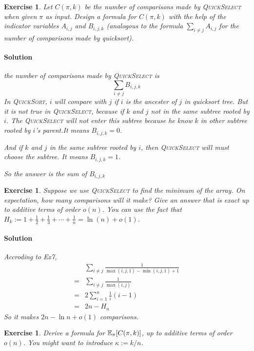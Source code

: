 \documentclass[12pt,a4]{article}
\newcommand{\E}{\mathop{\mathbb{E\/}}}
\newtheorem{exercise}[theorem]{Exercise}
\begin{document}
\begin{exercise}
  Let $C(\pi,k)$ be the number of comparisons made by \textsc{QuickSelect} when given
  $\pi$ as input. Design a formula for $C(\pi,k)$ with the help of the indicator
  variables $A_{i,j}$ and $B_{i,j,k}$ (analogous to the formula 
  $\sum_{i \ne j} A_{i,j}$ for the number of comparisons made by quicksort).
  
    \paragraph{Solution}
  the number of comparisons made by \textsc{QuickSelect} is
  $$
    \sum_{i\not=j}B_{i,j,k}
  $$
  In \textsc{QuickSort}, $i$ will compare with $j$ if $i$ is the ancester of
  $j$ in quicksort tree. But it is not true in \textsc{QuickSelect}, because if $k$ and $j$ 
  not in the same subtree rooted by $i$. The \textsc{QuickSelect} will not enter this subtree because he
  know $k$ in other subtree rooted by $i$'s parent.It means $B_{i,j,k}=0$.
  
  And if $k$ and $j$ in the same subtree rooted by $i$, then \textsc{QuickSelect} will must choose
  the subtree. It means $B_{i,j,k}=1$.
  
  So the answer is the sum of $B_{i,j,k}$
\end{exercise}


\begin{exercise}
   Suppose we use \textsc{QuickSelect} to find the minimum of the array. On expectation,
   how many comparisons will it make? Give an answer that is exact up to additive terms 
   of order $o(n)$.
     You can use the fact that $H_k := 1 + \frac{1}{2} + \frac{1}{3} + \cdots  + \frac{1}{n} = \ln(n) + o(1)$.
     
    \paragraph{Solution}  
  Accroding to Ex7,
  \begin{align*}
    &\sum_{i \not= j} \frac 1 {\max(i,j,1) - \min(i,j,1) + 1} \\
    =& \sum_{i \not= j}\frac 1 {\max(i,j)} \\
    =& 2\sum_{i=1}^n \frac 1 i (i - 1) \\
    =& 2n - H_n
  \end{align*}
  So it makes $2n - \ln n + o(1)$ comparisons.
\end{exercise}

\begin{exercise}
  Derive a formula for $\E_{\pi} [C(\pi,k)]$, up to additive terms of order $o(n)$.
  You might want to introduce $\kappa := k/n$.
  
  
\end{exercise}
\end{document}
